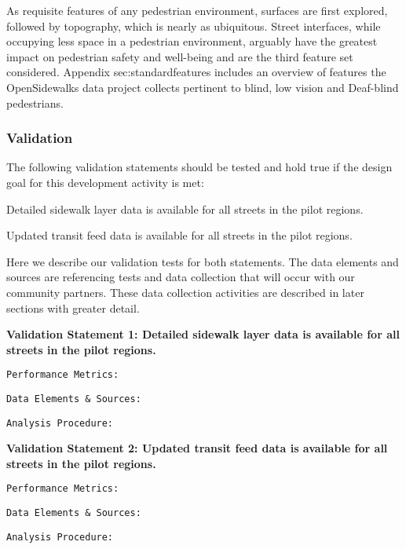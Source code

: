 As requisite features of any pedestrian environment, surfaces are first explored, followed by topography, which is nearly as ubiquitous.  Street interfaces, while occupying less space in a pedestrian environment, arguably have the greatest impact on pedestrian safety and well-being and are the third feature set considered. Appendix \ac{sec:standardfeatures} includes an overview of features the OpenSidewalks data project collects pertinent to blind, low vision and Deaf-blind pedestrians.

\subsubsection{Validation}

The following validation statements should be tested and hold true if the design goal for this development activity is met: 

Detailed sidewalk layer data is available for all streets in the pilot regions.

Updated transit feed data is available for all streets in the pilot regions.

Here we describe our validation tests for both statements. The data elements and sources are referencing tests and data collection that will occur with our community partners. These data collection activities are described in later sections with greater detail.

\textbf{Validation Statement 1:
Detailed sidewalk layer data is available for all streets in the pilot regions.}

\texttt{Performance Metrics:} 

\texttt{Data Elements \& Sources:}

\texttt{Analysis Procedure:}

\textbf{Validation Statement 2:
Updated transit feed data is available for all streets in the pilot regions.}


\texttt{Performance Metrics:} 

\texttt{Data Elements \& Sources:}

\texttt{Analysis Procedure:}
